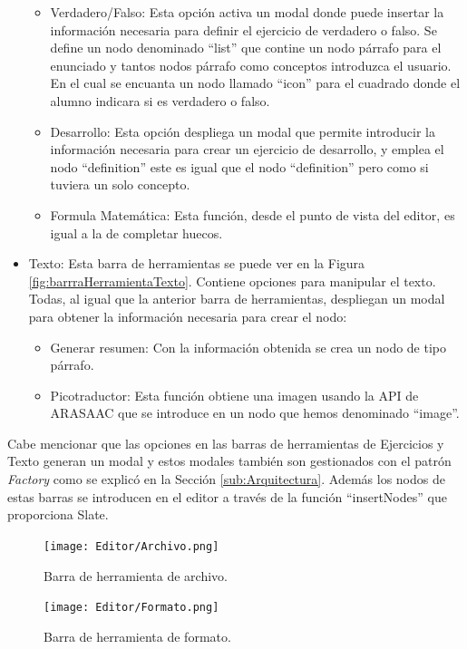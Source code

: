 \begin{itemize}
\begin{itemize}
          \item Verdadero/Falso: Esta opción activa un modal donde puede insertar la información necesaria para definir el ejercicio de verdadero o falso. Se define un nodo denominado ``list'' que contine un nodo párrafo para el enunciado y tantos nodos párrafo como conceptos introduzca el usuario. En el cual se encuanta un nodo llamado ``icon'' para el cuadrado donde el alumno indicara si es verdadero o falso.
          \item Desarrollo: Esta opción despliega un modal que permite introducir la información necesaria para crear un ejercicio de desarrollo, y emplea el nodo ``definition'' este es igual que el nodo ``definition'' pero como si tuviera un solo concepto.
          \item Formula Matemática: Esta función, desde el punto de vista del editor, es igual a la de completar huecos.
        \end{itemize}
  \item Texto: Esta barra de herramientas se puede ver en la Figura \ref{fig:barrraHerramientaTexto}. Contiene opciones para manipular el texto. Todas, al igual que la anterior barra de herramientas, despliegan un modal para obtener la información necesaria para crear el nodo:
        \begin{itemize}
          \item Generar resumen: Con la información obtenida se crea un nodo de tipo párrafo.
          \item Picotraductor: Esta función obtiene una imagen usando la API de ARASAAC que se introduce en un nodo que hemos denominado ``image''.
        \end{itemize}
\end{itemize}

Cabe mencionar que las opciones en las barras de herramientas de Ejercicios y Texto generan un modal y estos modales también son gestionados con el patrón \textit{Factory} como se explicó en la Sección \ref{sub:Arquitectura}. Además los nodos de estas barras se introducen en el editor a través de la función ``insertNodes'' que proporciona Slate.

\begin{figure}[h!]
  \centering
  \texttt{[image: Editor/Archivo.png]}
  \caption{Barra de herramienta de archivo.}
  \label{fig:barrraHerramientaArchivo}
\end{figure}

\begin{figure}[h!]
  \centering
  \texttt{[image: Editor/Formato.png]}
  \caption{Barra de herramienta de formato.}
  \label{fig:barrraHerramientaFormato}
\end{figure}

